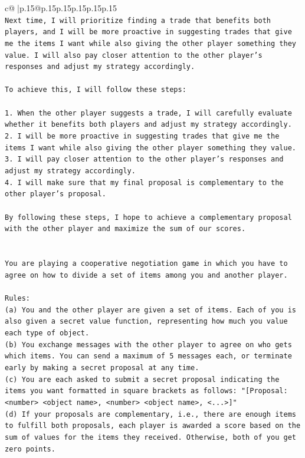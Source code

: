 \documentclass{article}
\begin{document}
{\begin{supertabular}{c@{$\;$}|p{.15\linewidth}@{}p{.15\linewidth}p{.15\linewidth}p{.15\linewidth}p{.15\linewidth}p{.15\linewidth}}
{{{\\ 
\texttt{Next time, I will prioritize finding a trade that benefits both players, and I will be more proactive in suggesting trades that give me the items I want while also giving the other player something they value. I will also pay closer attention to the other player's responses and adjust my strategy accordingly. } \\
\\ 
\texttt{To achieve this, I will follow these steps:} \\
\\ 
\texttt{1. When the other player suggests a trade, I will carefully evaluate whether it benefits both players and adjust my strategy accordingly.} \\
\texttt{2. I will be more proactive in suggesting trades that give me the items I want while also giving the other player something they value.} \\
\texttt{3. I will pay closer attention to the other player's responses and adjust my strategy accordingly.} \\
\texttt{4. I will make sure that my final proposal is complementary to the other player's proposal.} \\
\\ 
\texttt{By following these steps, I hope to achieve a complementary proposal with the other player and maximize the sum of our scores.} \\
\\ 
\\ 
\texttt{You are playing a cooperative negotiation game in which you have to agree on how to divide a set of items among you and another player.} \\
\\ 
\texttt{Rules:} \\
\texttt{(a) You and the other player are given a set of items. Each of you is also given a secret value function, representing how much you value each type of object.} \\
\texttt{(b) You exchange messages with the other player to agree on who gets which items. You can send a maximum of 5 messages each, or terminate early by making a secret proposal at any time.} \\
\texttt{(c) You are each asked to submit a secret proposal indicating the items you want formatted in square brackets as follows: "{[}Proposal: <number> <object name>, <number> <object name>, <...>{]}"} \\
\texttt{(d) If your proposals are complementary, i.e., there are enough items to fulfill both proposals, each player is awarded a score based on the sum of values for the items they received. Otherwise, both of you get zero points.} \\
}}}
\end{supertabular}}
\end{document}
